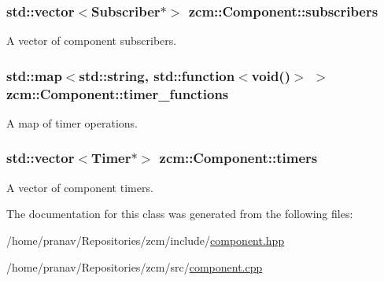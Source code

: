 \subsubsection[{\texorpdfstring{subscribers}{subscribers}}]{\setlength{\rightskip}{0pt plus 5cm}std\+::vector$<${\bf Subscriber}$\ast$$>$ zcm\+::\+Component\+::subscribers\hspace{0.3cm}{\ttfamily [protected]}}\hypertarget{classzcm_1_1Component_a9f9e58fb5d2189b183ffd22ce905d620}{}\label{classzcm_1_1Component_a9f9e58fb5d2189b183ffd22ce905d620}


A vector of component subscribers. 

\subsubsection[{\texorpdfstring{timer\+\_\+functions}{timer_functions}}]{\setlength{\rightskip}{0pt plus 5cm}std\+::map$<$std\+::string, std\+::function$<$void()$>$ $>$ zcm\+::\+Component\+::timer\+\_\+functions}\hypertarget{classzcm_1_1Component_a9769fc36758ee1f5a667ed23b814dc4b}{}\label{classzcm_1_1Component_a9769fc36758ee1f5a667ed23b814dc4b}


A map of timer operations. 

\subsubsection[{\texorpdfstring{timers}{timers}}]{\setlength{\rightskip}{0pt plus 5cm}std\+::vector$<${\bf Timer}$\ast$$>$ zcm\+::\+Component\+::timers\hspace{0.3cm}{\ttfamily [protected]}}\hypertarget{classzcm_1_1Component_a506eac4aebc9e02f0df246afbbac7d75}{}\label{classzcm_1_1Component_a506eac4aebc9e02f0df246afbbac7d75}


A vector of component timers. 



The documentation for this class was generated from the following files\+:\begin{DoxyCompactItemize}
\item 
/home/pranav/\+Repositories/zcm/include/\hyperlink{component_8hpp}{component.\+hpp}\item 
/home/pranav/\+Repositories/zcm/src/\hyperlink{component_8cpp}{component.\+cpp}\end{DoxyCompactItemize}
